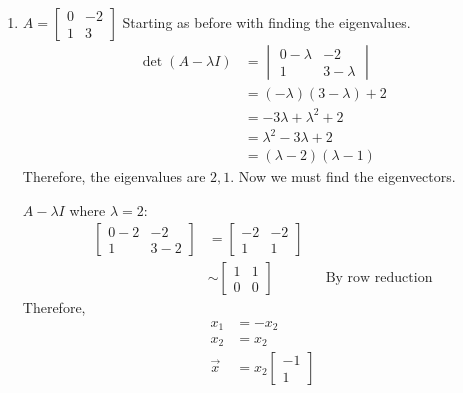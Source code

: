 \documentclass[10pt,letterpaper,final]{report}
\newcommand{\reason}[1]{&& \text{#1}}
\begin{document}
\begin{enumerate}[label=(\alph*)]
  \item $A = \begin{bmatrix}
            0 & -2 \\
            1 & 3
          \end{bmatrix}$
        Starting as before with finding the eigenvalues.
        \begin{align*}
          \det(A - \lambda I) & = \begin{vmatrix}
                                    0 - \lambda & -2          \\
                                    1           & 3 - \lambda
                                  \end{vmatrix} \\[1ex]
                              & = (-\lambda)(3 - \lambda) + 2 \\[1ex]
                              & = -3\lambda + \lambda^2 + 2   \\[1ex]
                              & = \lambda^2 - 3\lambda + 2    \\[1ex]
                              & = (\lambda - 2)(\lambda - 1)
        \end{align*}
        Therefore, the eigenvalues are $2, 1$. Now we must find the eigenvectors.

        $A - \lambda I$ where $\lambda = 2$:
        \begin{align*}
          \begin{bmatrix}
            0 - 2 & -2    \\
            1     & 3 - 2
          \end{bmatrix} & = \begin{bmatrix}
                              -2 & -2 \\
                              1  & 1
                            \end{bmatrix}                                \\[1ex]
                             & \sim \begin{bmatrix}
                                      1 & 1 \\
                                      0 & 0
                                    \end{bmatrix} \reason{By row reduction}
        \end{align*}
        Therefore,
        \begin{align*}
          x_1     & = -x_2                \\
          x_2     & = x_2                 \\
          \vec{x} & = x_2\begin{bmatrix}
                           -1 \\
                           1
                         \end{bmatrix}
        \end{align*}


\end{enumerate}
\end{document}
